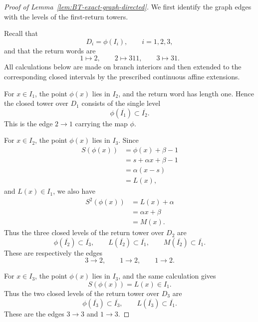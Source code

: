 \documentclass[11pt]{amsart}
\theoremstyle{plain}
\theoremstyle{definition}
\theoremstyle{remark}
\begin{document}
\begin{proof}[Proof of Lemma~\ref{lem:BT-exact-graph-directed}]
We first identify the graph edges with the levels of the first-return
towers.

Recall that
\[
        D_i=\phi(I_i),
        \qquad i=1,2,3,
\]
and that the return words are
\[
        1\mapsto2,
        \qquad
        2\mapsto311,
        \qquad
        3\mapsto31.
\]
All calculations below are made on branch interiors and then extended to
the corresponding closed intervals by the prescribed continuous affine
extensions.

For \(x\in I_1\), the point \(\phi(x)\) lies in \(I_2\), and the return
word has length one. Hence the closed tower over \(D_1\) consists of the
single level
\[
        \phi(\overline{I_1})
        \subset\overline{I_2}.
\]
This is the edge \(2\to1\) carrying the map \(\phi\).

For \(x\in I_2\), the point \(\phi(x)\) lies in \(I_3\). Since
\[
\begin{aligned}
        S(\phi(x))
        &=
        \phi(x)+\beta-1\\
        &=
        s+\alpha x+\beta-1\\
        &=
        \alpha(x-s)\\
        &=
        L(x),
\end{aligned}
\]
and \(L(x)\in I_1\), we also have
\[
\begin{aligned}
        S^2(\phi(x))
        &=
        L(x)+\alpha\\
        &=
        \alpha x+\beta\\
        &=
        M(x).
\end{aligned}
\]
Thus the three closed levels of the return tower over \(D_2\) are
\[
        \phi(\overline{I_2})\subset\overline{I_3},
        \qquad
        L(\overline{I_2})\subset\overline{I_1},
        \qquad
        M(\overline{I_2})\subset\overline{I_1}.
\]
These are respectively the edges
\[
        3\to2,\qquad 1\to2,\qquad 1\to2.
\]

For \(x\in I_3\), the point \(\phi(x)\) lies in \(I_3\), and the same
calculation gives
\[
        S(\phi(x))=L(x)\in I_1.
\]
Thus the two closed levels of the return tower over \(D_3\) are
\[
        \phi(\overline{I_3})\subset\overline{I_3},
        \qquad
        L(\overline{I_3})\subset\overline{I_1}.
\]
These are the edges \(3\to3\) and \(1\to3\).


\end{proof}
\end{document}
